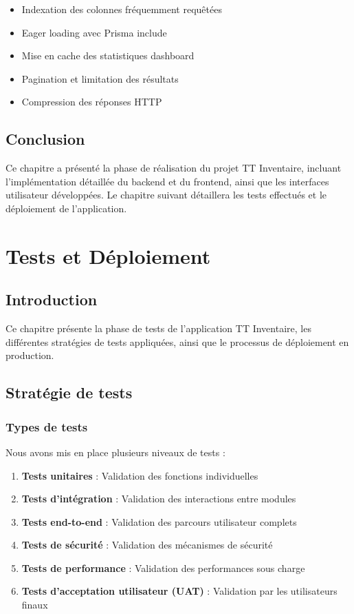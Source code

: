 \begin{itemize}
    \item Indexation des colonnes fréquemment requêtées
    \item Eager loading avec Prisma include
    \item Mise en cache des statistiques dashboard
    \item Pagination et limitation des résultats
    \item Compression des réponses HTTP
\end{itemize}

\section{Conclusion}

Ce chapitre a présenté la phase de réalisation du projet TT Inventaire, incluant l'implémentation détaillée du backend et du frontend, ainsi que les interfaces utilisateur développées. Le chapitre suivant détaillera les tests effectués et le déploiement de l'application.

\chapter{Tests et Déploiement}

\section{Introduction}

Ce chapitre présente la phase de tests de l'application TT Inventaire, les différentes stratégies de tests appliquées, ainsi que le processus de déploiement en production.

\section{Stratégie de tests}

\subsection{Types de tests}

Nous avons mis en place plusieurs niveaux de tests :

\begin{enumerate}
    \item \textbf{Tests unitaires} : Validation des fonctions individuelles
    \item \textbf{Tests d'intégration} : Validation des interactions entre modules
    \item \textbf{Tests end-to-end} : Validation des parcours utilisateur complets
    \item \textbf{Tests de sécurité} : Validation des mécanismes de sécurité
    \item \textbf{Tests de performance} : Validation des performances sous charge
    \item \textbf{Tests d'acceptation utilisateur (UAT)} : Validation par les utilisateurs finaux
\end{enumerate}

